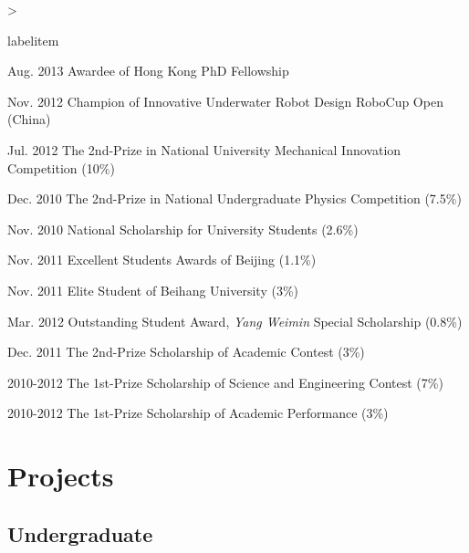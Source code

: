 \documentclass[10pt,letterpaper]{article}
\makeatletter
\newenvironment{dateitemize}{%
  \ifnum \@itemdepth >\thr@@\@toodeep\else
    \advance\@itemdepth\@ne
    \edef\@itemitem{labelitem\romannumeral\the\@itemdepth}%
    \expandafter
    \list
      \csname\@itemitem\endcsname
      {%
      \advance\rightmargin3cm
      \def\makelabel##1{\hss\llap{\textbullet}\rlap{\hbox to \dimexpr\linewidth+\rightmargin+\itemsep\relax{\hss##1}}}}%
  \fi}
\makeatother
\begin{document}
\begin{dateitemize}
  \item[Aug. 2013] Awardee of Hong Kong PhD Fellowship
  \item[Nov. 2012] Champion of Innovative Underwater Robot Design RoboCup Open (China)
  \item[Jul. 2012] The 2nd-Prize in National University Mechanical Innovation Competition (10\%)
  \item[Dec. 2010] The 2nd-Prize in National Undergraduate Physics Competition (7.5\%)
  \item[Nov. 2010] National Scholarship for University Students (2.6\%)
  \item[Nov. 2011] Excellent Students Awards of Beijing (1.1\%)
  \item[Nov. 2011] Elite Student of Beihang University (3\%)
  \item[Mar. 2012] Outstanding Student Award, \textit{Yang Weimin} Special Scholarship (0.8\%)
  \item[Dec. 2011] The 2nd-Prize Scholarship of Academic Contest (3\%)
  \item[2010-2012] The 1st-Prize Scholarship of Science and Engineering Contest (7\%)
  \item[2010-2012] The 1st-Prize Scholarship of Academic Performance (3\%)
\end{dateitemize}

\section*{Projects}

\subsection*{Undergraduate}
\end{document}
